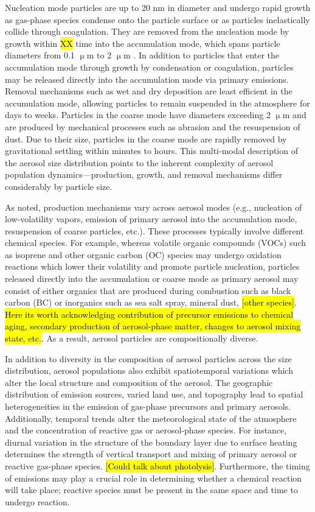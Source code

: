 Nucleation mode particles are up to 20 nm in diameter and undergo rapid growth as gas-phase species condense onto the particle surface or as particles inelastically collide through coagulation. They are removed from the nucleation mode by growth within \hl{XX} time into the accumulation mode, which spans particle diameters from 0.1 $\upmu$m to 2 $\upmu$m . In addition to particles that enter the accumulation mode through growth by condensation or coagulation, particles may be released directly into the accumulation mode via primary emissions. Removal mechanisms such as wet and dry deposition are least efficient in the accumulation mode, allowing particles to remain suspended in the atmosphere for days to weeks. Particles in the coarse mode have diameters exceeding 2 $\upmu$m  and are produced by mechanical processes such as abrasion and the resuspension of dust. Due to their size, particles in the coarse mode are rapidly removed by gravitational settling within minutes to hours. This multi-modal description of the aerosol size distribution points to the inherent complexity of aerosol population dynamics---production, growth, and removal mechanisms differ considerably by particle size. 

As noted, production mechanisms vary across aerosol modes (e.g., nucleation of low-volatility vapors, emission of primary aerosol  into the accumulation mode, resuspension of coarse particles, etc.). These processes typically involve different chemical species. For example, whereas volatile organic compounds (VOCs) such as isoprene and other organic carbon (OC) species may undergo oxidation reactions which lower their volatility and promote particle nucleation, particles released directly into the accumulation or coarse mode as primary aerosol may consist of either organics that are produced during combustion such as black carbon (BC) or inorganics such as sea salt spray, mineral dust, \hl{[other species]}. \hl{Here its worth acknowledging contribution of precursor emissions to chemical aging, secondary production of aerosol-phase matter, changes to aerosol mixing state, etc.}. As a result, aerosol particles are compositionally diverse. 

In addition to diversity in the composition of aerosol particles across the size distribution, aerosol populations also exhibit spatiotemporal variations which alter the local structure and composition of the aerosol. The geographic distribution of emission sources, varied land use, and topography lead to spatial heterogeneities in the emission of gas-phase precursors and primary aerosols. Additionally, temporal trends alter the meteorological state of the atmosphere and the concentration of reactive gas or aerosol-phase species. For instance, diurnal variation in the structure of the boundary layer due to surface heating determines the strength of vertical transport and mixing of primary aerosol or reactive gas-phase species. \hl{[Could talk about photolysis]}. Furthermore, the timing of emissions may play a crucial role in determining whether a chemical reaction will take place; reactive species must be present in the same space and time to undergo reaction.

